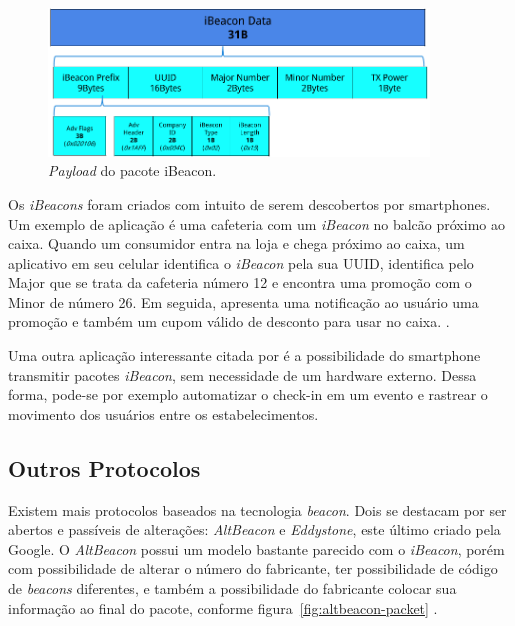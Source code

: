 \begin{figure}[htb]
	\caption{\label{fig:ibeacon-packet}\textit{Payload} do pacote iBeacon.}
	\begin{center}
		\includegraphics[width=0.9\textwidth]{img/ibeacon-packet.png}
	\end{center}
\end{figure}

Os \textit{iBeacons} foram criados com intuito de serem descobertos por smartphones. Um exemplo de aplicação é uma cafeteria com um \textit{iBeacon} no balcão próximo ao caixa. Quando um consumidor entra na loja e chega próximo ao caixa, um aplicativo em seu celular identifica o \textit{iBeacon} pela sua UUID, identifica pelo Major que se trata da cafeteria número 12 e encontra uma promoção com o Minor de número 26. Em seguida, apresenta uma notificação ao usuário uma promoção e também um cupom válido de desconto para usar no caixa. \cite{arm-beacons}.

Uma outra aplicação interessante citada por  é a possibilidade do smartphone transmitir pacotes \textit{iBeacon}, sem necessidade de um hardware externo. Dessa forma, pode-se por exemplo automatizar o check-in em um evento e rastrear o movimento dos usuários entre os estabelecimentos.

\subsection{Outros Protocolos}\label{sec:outros-protocolos}

Existem mais protocolos baseados na tecnologia \textit{beacon}. Dois se destacam por ser abertos e passíveis de alterações: \textit{AltBeacon} e \textit{Eddystone}, este último criado pela Google. O \textit{AltBeacon} possui um modelo bastante parecido com o \textit{iBeacon}, porém com possibilidade de alterar o número do fabricante, ter possibilidade de código de \textit{beacons} diferentes, e também a possibilidade do fabricante colocar sua informação ao final do pacote, conforme figura~\ref{fig:altbeacon-packet} \cite{arm-beacons}.

